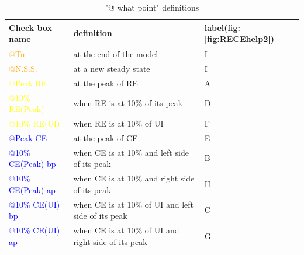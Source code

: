 \documentclass[11pt,a4paper,titlepage]{report}
\begin{document}
\begin{table}[H]
\centering
\caption{"@ what point" definitions}
\begin{tabular}{l|l|l}
Check box name&definition&label(fig:\ref{fig:RECEhelp2})\\
\hline
\textcolor{orange}{@Tn}&at the end of the model&I\\
\textcolor{orange}{@N.S.S.}&at a new steady state&I\\
\textcolor{yellow}{@Peak RE}&at the peak of RE&A\\
\textcolor{yellow}{@10\% RE(Peak)}&when RE is at 10\% of its peak&D\\
\textcolor{yellow}{@10\% RE(UI)}&when RE is at 10\% of UI&F\\
\textcolor{blue}{@Peak CE}&at the peak of CE&E\\
\textcolor{blue}{@10\% CE(Peak) bp}&when CE is at 10\% and left side of its peak&B\\
\textcolor{blue}{@10\% CE(Peak) ap}&when CE is at 10\% and right side of its peak&H\\
\textcolor{blue}{@10\% CE(UI) bp}&when CE is at 10\% of UI and left side of its peak&C\\
\textcolor{blue}{@10\% CE(UI) ap}&when CE is at 10\% of UI and right side of its peak&G\\
\end{tabular}\\
\label{tab:@RT} 
\end{table}
\end{document}

